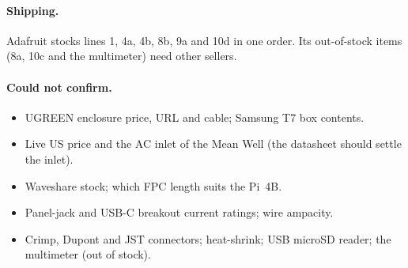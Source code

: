 \documentclass[10pt,a4paper]{article}
\begin{document}
\paragraph{Shipping.} Adafruit stocks lines 1, 4a, 4b, 8b, 9a and 10d in one order. Its out-of-stock items (8a, 10c and the multimeter) need other sellers.

\paragraph{Could not confirm.}
\begin{itemize}
  \item UGREEN enclosure price, URL and cable; Samsung T7 box contents.
  \item Live US price and the AC inlet of the Mean Well (the datasheet should settle the inlet).
  \item Waveshare stock; which FPC length suits the Pi~4B.
  \item Panel-jack and USB-C breakout current ratings; wire ampacity.
  \item Crimp, Dupont and JST connectors; heat-shrink; USB microSD reader; the multimeter (out of stock).
\end{itemize}
\end{document}
